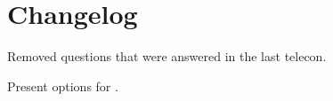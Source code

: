 \section{Changelog}
\begin{revision}
  \item Removed questions that were answered in the last telecon.
  \item Present options for .
\end{revision}
